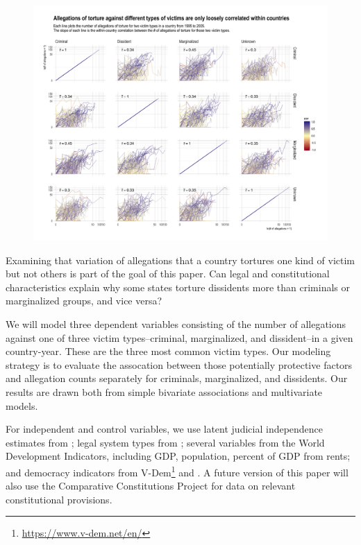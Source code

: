 \documentclass[12pt]{article}
\begin{document}
\begin{figure}
\begin{center}
\caption{}
\label{fig:correlation-matrix}
\includegraphics[width=.99\textwidth]{../output/allegations-by-victim-scatterplots.png}
\end{center}
\end{figure}

Examining that variation of allegations that a country tortures one kind of victim but not others is part of the goal of this paper. Can legal and constitutional characteristics explain why some states torture dissidents more than criminals or marginalized groups, and vice versa?

We will model three dependent variables consisting of the number of allegations against one of three victim types--criminal, marginalized, and dissident--in a given country-year. These are the three most common victim types. Our modeling strategy is to evaluate the assocation between those potentially protective factors and allegation counts separately for criminals, marginalized, and dissidents. Our results are drawn both from simple bivariate associations and multivariate models. 

For independent and control variables, we use latent judicial independence estimates from \citet{linzer2015global}; legal system types from \citet{mitchell2013domestic}; several variables from the World Development Indicators, including GDP, population, percent of GDP from rents; and democracy indicators from V-Dem\footnote{\url{https://www.v-dem.net/en/}} and \citet{cheibub2010democracy}. A future version of this paper will also use the Comparative Constitutions Project for data on relevant constitutional provisions. 
\end{document}
